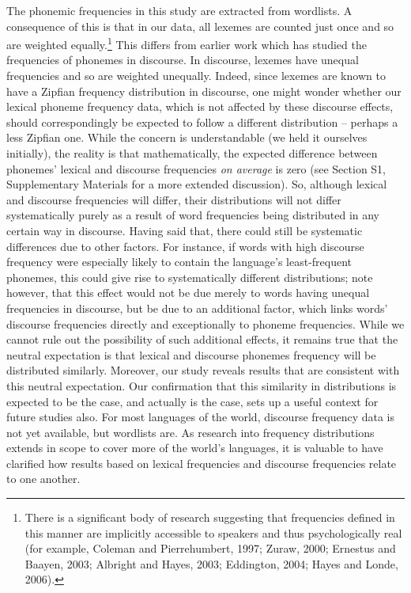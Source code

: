 The phonemic frequencies in this study are extracted from wordlists. A consequence of this is that in our data, all lexemes are counted just once and so are weighted equally.\footnote{There is a significant body of research suggesting that frequencies defined in this manner are implicitly accessible to speakers and thus psychologically real (for example, Coleman and Pierrehumbert, 1997; Zuraw, 2000; Ernestus and Baayen, 2003; Albright and Hayes, 2003; Eddington, 2004; Hayes and Londe, 2006).} This differs from earlier work which has studied the frequencies of phonemes in discourse. In discourse, lexemes have unequal frequencies and so are weighted unequally. Indeed, since lexemes are known to have a Zipfian frequency distribution in discourse, one might wonder whether our lexical phoneme frequency data, which is not affected by these discourse effects, should correspondingly be expected to follow a different distribution -- perhaps a less Zipfian one. While the concern is understandable (we held it ourselves initially), the reality is that mathematically, the expected difference between phonemes' lexical and discourse frequencies \emph{on average} is zero (see Section S1, Supplementary Materials for a more extended discussion). So, although lexical and discourse frequencies will differ, their distributions will not differ systematically purely as a result of word frequencies being distributed in any certain way in discourse. Having said that, there could still be systematic differences due to other factors. For instance, if words with high discourse frequency were especially likely to contain the language's least-frequent phonemes, this could give rise to systematically different distributions; note however, that this effect would not be due merely to words having unequal frequencies in discourse, but be due to an additional factor, which links words' discourse frequencies directly and exceptionally to phoneme frequencies. While we cannot rule out the possibility of such additional effects, it remains true that the neutral expectation is that lexical and discourse phonemes frequency will be distributed similarly. Moreover, our study reveals results that are consistent with this neutral expectation. Our confirmation that this similarity in distributions is expected to be the case, and actually is the case, sets up a useful context for future studies also. For most languages of the world, discourse frequency data is not yet available, but wordlists are. As research into frequency distributions extends in scope to cover more of the world's languages, it is valuable to have clarified how results based on lexical frequencies and discourse frequencies relate to one another.

